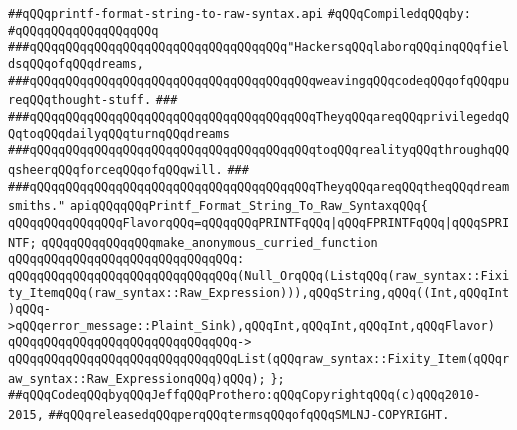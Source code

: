 \label{src/lib/compiler/front/parser/raw-syntax/printf-format-string-to-raw-syntax.api}
\verb|##qQQqprintf-format-string-to-raw-syntax.api|\newline
\newline
\verb|#qQQqCompiledqQQqby:|\newline
\verb|#qQQqqQQqqQQqqQQqqQQq|\newline
\newline
\newline
\newline
\verb|###qQQqqQQqqQQqqQQqqQQqqQQqqQQqqQQqqQQq"HackersqQQqlaborqQQqinqQQqfieldsqQQqofqQQqdreams,|\newline
\verb|###qQQqqQQqqQQqqQQqqQQqqQQqqQQqqQQqqQQqqQQqweavingqQQqcodeqQQqofqQQqpureqQQqthought-stuff.|\newline
\verb|###|\newline
\verb|###qQQqqQQqqQQqqQQqqQQqqQQqqQQqqQQqqQQqqQQqTheyqQQqareqQQqprivilegedqQQqtoqQQqdailyqQQqturnqQQqdreams|\newline
\verb|###qQQqqQQqqQQqqQQqqQQqqQQqqQQqqQQqqQQqqQQqtoqQQqrealityqQQqthroughqQQqsheerqQQqforceqQQqofqQQqwill.|\newline
\verb|###|\newline
\verb|###qQQqqQQqqQQqqQQqqQQqqQQqqQQqqQQqqQQqqQQqTheyqQQqareqQQqtheqQQqdreamsmiths."|\newline
\newline
\newline
\newline
\verb|apiqQQqqQQqPrintf_Format_String_To_Raw_SyntaxqQQq{|\newline
\newline
\verb|qQQqqQQqqQQqqQQqFlavorqQQq=qQQqqQQqPRINTFqQQq|\verb#|qQQqFPRINTFqQQq|qQQqSPRINTF;#\newline
\newline
\verb|qQQqqQQqqQQqqQQqmake_anonymous_curried_function|\newline
\verb|qQQqqQQqqQQqqQQqqQQqqQQqqQQqqQQq:|\newline
\verb|qQQqqQQqqQQqqQQqqQQqqQQqqQQqqQQq(Null_OrqQQq(ListqQQq(raw_syntax::Fixity_ItemqQQq(raw_syntax::Raw_Expression))),qQQqString,qQQq((Int,qQQqInt)qQQq->qQQqerror_message::Plaint_Sink),qQQqInt,qQQqInt,qQQqInt,qQQqFlavor)|\newline
\verb|qQQqqQQqqQQqqQQqqQQqqQQqqQQqqQQq->|\newline
\verb|qQQqqQQqqQQqqQQqqQQqqQQqqQQqqQQqList(qQQqraw_syntax::Fixity_Item(qQQqraw_syntax::Raw_ExpressionqQQq)qQQq);|\newline
\verb|};|\newline
\newline
\newline
\verb|##qQQqCodeqQQqbyqQQqJeffqQQqProthero:qQQqCopyrightqQQq(c)qQQq2010-2015,|\newline
\verb|##qQQqreleasedqQQqperqQQqtermsqQQqofqQQqSMLNJ-COPYRIGHT.|\newline

